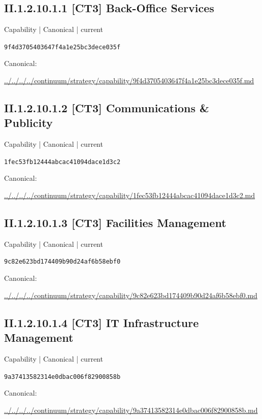\documentclass[10pt,a4paper]{article}
\begin{document}
\subsection*{II.1.2.10.1.1 [CT3] Back-Office Services}
{\small Capability | Canonical | current}\par
\texttt{9f4d3705403647f4a1e25bc3dece035f}\par
Canonical: \par
{\footnotesize\url{../../../../continuum/strategy/capability/9f4d3705403647f4a1e25bc3dece035f.md}}\par
\subsection*{II.1.2.10.1.2 [CT3] Communications \& Publicity}
{\small Capability | Canonical | current}\par
\texttt{1fec53fb12444abcac41094dace1d3c2}\par
Canonical: \par
{\footnotesize\url{../../../../continuum/strategy/capability/1fec53fb12444abcac41094dace1d3c2.md}}\par
\subsection*{II.1.2.10.1.3 [CT3] Facilities Management}
{\small Capability | Canonical | current}\par
\texttt{9c82e623bd174409b90d24af6b58ebf0}\par
Canonical: \par
{\footnotesize\url{../../../../continuum/strategy/capability/9c82e623bd174409b90d24af6b58ebf0.md}}\par
\subsection*{II.1.2.10.1.4 [CT3] IT Infrastructure Management}
{\small Capability | Canonical | current}\par
\texttt{9a37413582314e0dbac006f82900858b}\par
Canonical: \par
{\footnotesize\url{../../../../continuum/strategy/capability/9a37413582314e0dbac006f82900858b.md}}\par
\end{document}
